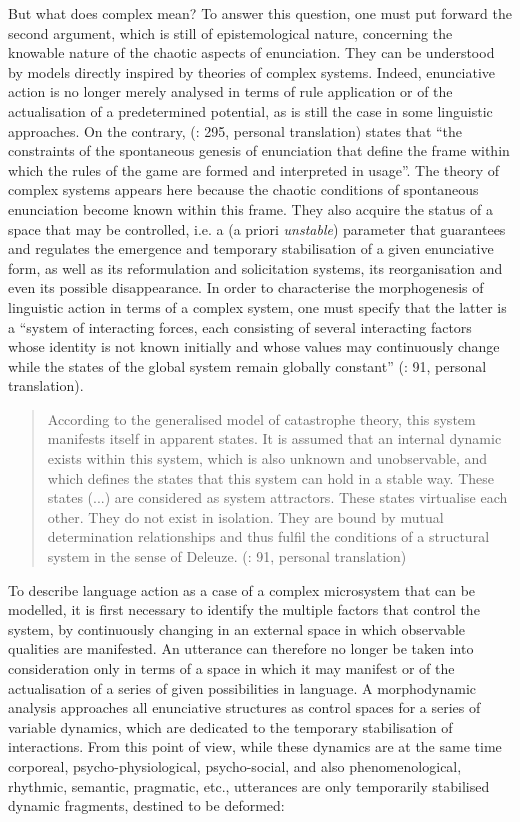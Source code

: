 \documentclass[output=paper]{langscibook}
\begin{document}
But what does complex mean? To answer this question, one must put forward the second argument, which is still of epistemological nature, concerning the knowable nature of the chaotic aspects of enunciation. They can be understood by models directly inspired by theories of complex systems. Indeed, enunciative action is no longer merely analysed in terms of rule application or of the actualisation of a predetermined potential, as is still the case in some linguistic approaches. On the contrary, (\citealt{Wildgen1999}: 295, personal translation) states that “the constraints of the spontaneous genesis of enunciation that define the frame within which the rules of the game are formed and interpreted in usage”. The theory of complex systems appears here because the chaotic conditions of spontaneous enunciation become known within this frame. They also acquire the status of a space that may be controlled, i.e. a (a priori \textit{unstable}) parameter that guarantees and regulates the emergence and temporary stabilisation of a given enunciative form, as well as its reformulation and solicitation systems, its reorganisation and even its possible disappearance. In order to characterise the morphogenesis of linguistic action in terms of a complex system, one must specify that the latter is a “system of interacting forces, each consisting of several interacting factors whose identity is not known initially and whose values may continuously change while the states of the global system remain globally constant” (\citealt{Virole2019}: 91, personal translation).

\begin{quote}
According to the generalised model of catastrophe theory, this system manifests itself in apparent states. It is assumed that an internal dynamic exists within this system, which is also unknown and unobservable, and which defines the states that this system can hold in a stable way. These states (...) are considered as system attractors. These states virtualise each other. They do not exist in isolation. They are bound by mutual determination relationships and thus fulfil the conditions of a structural system in the sense of Deleuze. (\citealt{Virole2019}: 91, personal translation)
\end{quote}

To describe language action as a case of a complex microsystem that can be modelled, it is first necessary to identify the multiple factors that control the system, by continuously changing in an external space in which observable qualities are manifested. An utterance can therefore no longer be taken into consideration only in terms of a space in which it may manifest or of the actualisation of a series of given possibilities in language. A morphodynamic analysis approaches all enunciative structures as control spaces for a series of variable dynamics, which are dedicated to the temporary stabilisation of interactions. From this point of view, while these dynamics are at the same time corporeal, psycho-physiological, psycho-social, and also phenomenological, rhythmic, semantic, pragmatic, etc., utterances are only temporarily stabilised dynamic fragments, destined to be deformed: 
\end{document}
